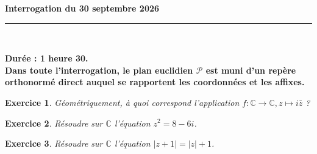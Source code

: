 \documentclass[11pt,a4paper]{article}
\title{}
\date{}
\newtheorem{ex}{Exercice}
\newcommand{\HRule}{\rule{\linewidth}{0.5mm}}
\begin{document}
\pagestyle{fancy}

\fancyhead{}
 \fancyfoot{}


\newcommand{\lb}{\llbracket}
\newcommand{\rb}{\rrbracket}
\newcommand{\N}{\mathbb{N}}
\newcommand{\Z}{\mathbb{Z}}
\newcommand{\R}{\mathbb{R}}
\newcommand{\C}{\mathbb{C}}



\newcommand{\md}[3]{#1\ \equiv \ #2 \! \! \! \! \! \pmod {#3} }
\newcommand{\nmd}[3]{#1 \not \equiv #2 \! \! \! \! \!  \pmod {#3} }
\newcommand{\mda}[3]{#1 \equiv #2 \! \!  \pmod {#3} }
\newcommand{\nmda}[3]{#1 \not \equiv #2 \! \! \pmod {#3} }
\newcommand{\mo}[2]{#1 \! \! \! \! \! \pmod #2 }
\newcommand{\moa}[2]{#1 \! \!  \pmod {#2} }

\renewcommand{\Re}{\operatorname{Re}}
\renewcommand{\Im}{\operatorname{Im}}

\thispagestyle{fancy}
\begin{center}
    { \huge \bfseries
    $ $\\
Interrogation du 30 septembre 2026
     \\ [.5cm] }
    \HRule \\[1cm]
\end{center}

\begin{center}
\textbf{Durée : 1 heure 30.\\ Dans toute l'interrogation, le plan euclidien $\mathcal P$ est muni d'un repère orthonormé direct auquel se rapportent les coordonnées et les affixes.}
\end{center}


\begin{ex}
Géométriquement, à quoi correspond l'application $f : \C\to\C, z\mapsto i\bar z$ ?
\end{ex}


\begin{ex}
Résoudre sur $\C$ l'équation $z^2=8-6i$.
\end{ex}


\begin{ex}
Résoudre sur $\C$ l'équation $|z+1|=|z|+1$.
\end{ex}
\end{document}
